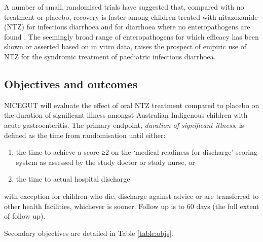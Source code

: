 \documentclass[a4paper]{article}
\begin{document}
A number of small, randomised trials have suggested that, compared with no treatment or placebo, recovery is faster among children treated with nitazoxanide (NTZ) for infectious diarrhoea and for diarrhoea where no enteropathogens are found \cite{Waddingtone019632}.
The seemingly broad range of enteropathogens for which efficacy has been shown or asserted based on in vitro data, raises the prospect of empiric use of NTZ for the syndromic treatment of paediatric infectious diarrhoea.

\subsection{Objectives and outcomes}

NICEGUT will evaluate the effect of oral NTZ treatment compared to placebo on the duration of significant illness amongst Australian Indigenous children with acute gastroenteritis.
The primary endpoint, \textit{duration of significant illness}, is defined as the time from randomisation until either:
\begin{enumerate}
    \item the time to achieve a score ≥2 on the `medical readiness for discharge' scoring system \cite{Waddingtone019632} as assessed by the study doctor or study nurse, or
    \item the time to actual hospital discharge
\end{enumerate}
with exception for children who die, discharge against advice or are transferred to other health facilities, whichever is sooner.
Follow up is to 60 days (the full extent of follow up).

Secondary objectives are detailed in Table \ref{table:objs}.
\end{document}
